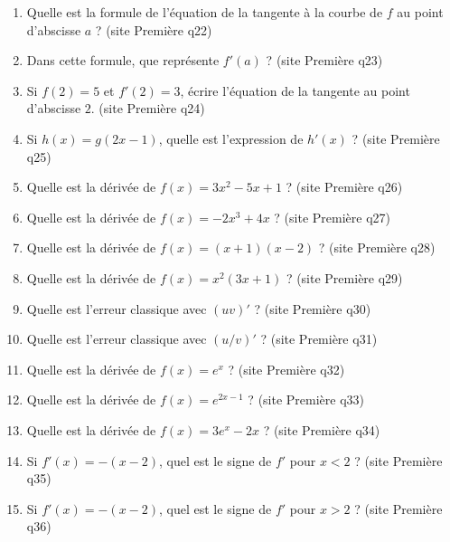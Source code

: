 \documentclass[11pt,a4paper]{article}
\newcommand{\sourceq}[1]{ {\scriptsize\textcolor{bleufonce}{(site Première q#1)}}}
\newcounter{question}
\newenvironment{blocquestions}[1]{%
  \begin{tcolorbox}[enhanced,breakable,colback=bleuclair,colframe=bleufonce,boxrule=0.6pt,arc=2mm,left=2mm,right=2mm,top=2mm,bottom=1.5mm,title={\bfseries #1},coltitle=white,colbacktitle=bleufonce,before skip=3mm,after skip=3mm, fontupper=\large]
  \large
  \begin{enumerate}[leftmargin=*,label=\textbf{\arabic*.},itemsep=0.82em,topsep=0.5em]
  \setcounter{enumi}{\value{question}}
}{%
  \setcounter{question}{\value{enumi}}
  \end{enumerate}
  \end{tcolorbox}
}
\begin{document}
\begin{blocquestions}{Questions flash -- Dérivation}
  \item Quelle est la formule de l'équation de la tangente à la courbe de $f$ au point d'abscisse $a$ ? \sourceq{22}
  \item Dans cette formule, que représente $f'(a)$ ? \sourceq{23}
  \item Si $f(2)=5$ et $f'(2)=3$, écrire l'équation de la tangente au point d'abscisse $2$. \sourceq{24}
  \item Si $h(x)=g(2x-1)$, quelle est l'expression de $h'(x)$ ? \sourceq{25}
  \item Quelle est la dérivée de $f(x)=3x^2-5x+1$ ? \sourceq{26}
  \item Quelle est la dérivée de $f(x)=-2x^3+4x$ ? \sourceq{27}
  \item Quelle est la dérivée de $f(x)=(x+1)(x-2)$ ? \sourceq{28}
  \item Quelle est la dérivée de $f(x)=x^2(3x+1)$ ? \sourceq{29}
  \item Quelle est l'erreur classique avec $(uv)'$ ? \sourceq{30}
  \item Quelle est l'erreur classique avec $(u/v)'$ ? \sourceq{31}
  \item Quelle est la dérivée de $f(x)=e^x$ ? \sourceq{32}
  \item Quelle est la dérivée de $f(x)=e^{2x-1}$ ? \sourceq{33}
  \item Quelle est la dérivée de $f(x)=3e^x-2x$ ? \sourceq{34}
  \item Si $f'(x)=-(x-2)$, quel est le signe de $f'$ pour $x<2$ ? \sourceq{35}
  \item Si $f'(x)=-(x-2)$, quel est le signe de $f'$ pour $x>2$ ? \sourceq{36}
\end{blocquestions}
\clearpage
\end{document}
